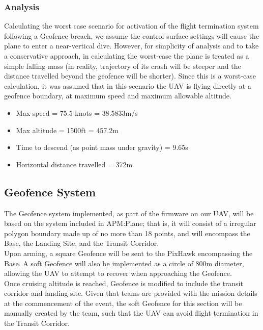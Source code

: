 \subsubsection{Analysis}
Calculating the worst case scenario for activation of the flight termination system following a Geofence breach, we assume the control surface settings will cause the plane to enter a near-vertical dive. However, for simplicity of analysis and to take a conservative approach, in calculating the worst-case the plane is treated as a simple falling mass (in reality, trajectory of its crash will be steeper and the distance travelled beyond the geofence will be shorter). Since this is a worst-case calculation, it was assumed that in this scenario the UAV is flying directly at a geofence boundary, at maximum speed and maximum allowable altitude.
\begin{itemize}
	\item Max speed = 75.5 knots = 38.5833m/s
	\item Max altitude = 1500ft = 457.2m
	\item Time to descend (as point mass under gravity) = 9.65s
	\item Horizontal distance travelled = 372m
\end{itemize}

\subsection{Geofence System}
The Geofence system implemented, as part of the firmware on our UAV, will be based on the system included in APM:Plane; that is, it will consist of a irregular polygon boundary made up of no more than 18 points, and will encompass the Base, the Landing Site, and the Transit Corridor.\\

Upon arming, a square Geofence will be sent to the PixHawk encompassing the Base. A soft Geofence will also be implemented as a circle of 800m diameter, allowing the UAV to attempt to recover when approaching the Geofence.\\

Once cruising altitude is reached, Geofence is modified to include the transit corridor and landing site. Given that teams are provided with the mission details at the commencement of the event, the soft Geofence for this section will be manually created by the team, such that the UAV can avoid flight termination in the Transit Corridor.\\

